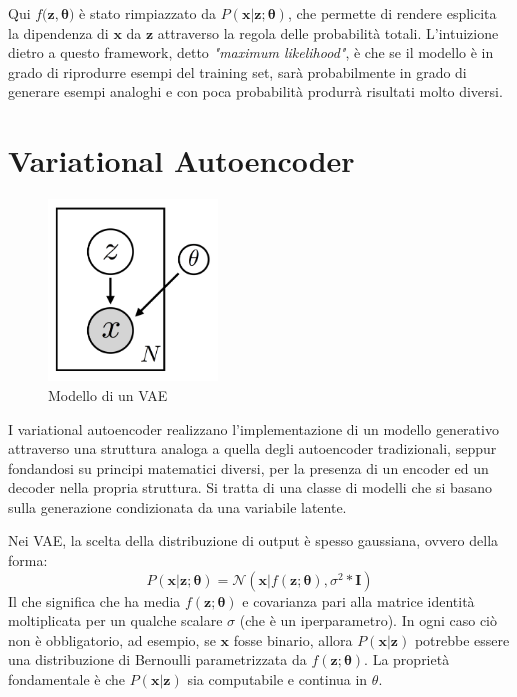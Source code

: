 Qui $f(\boldsymbol{z}, \boldsymbol{\theta)}$ è stato rimpiazzato da $P(\boldsymbol{x} | \boldsymbol{z}; \boldsymbol{\theta})$, che permette di rendere esplicita la dipendenza di $\boldsymbol{x}$ da $\boldsymbol{z}$ attraverso la regola delle probabilità totali. L'intuizione dietro a questo framework, detto \textit{"maximum likelihood"}, è che se il modello è in grado di riprodurre esempi del training set, sarà probabilmente in grado di generare esempi analoghi e con poca probabilità produrrà risultati molto diversi.
\section{Variational Autoencoder}
\begin{figure}[ht]
	\centering
	\includegraphics[width=0.4\textwidth]{img/vae_model.png}
	\caption{Modello di un VAE}
	\label{fig:1.13}
\end{figure}
I variational autoencoder realizzano l'implementazione di un modello generativo attraverso una struttura analoga a quella degli autoencoder tradizionali, seppur fondandosi su principi matematici diversi, per la presenza di un encoder ed un decoder nella propria struttura. Si tratta di una classe di modelli che si basano sulla generazione condizionata da una variabile latente.

Nei VAE, la scelta della distribuzione di output è spesso gaussiana, ovvero della forma:
\begin{equation}
	\label{gaussian_probability}
	P(\boldsymbol{x} | \boldsymbol{z}; \boldsymbol{\theta}) = \mathcal{N}(\boldsymbol{x}|f(\boldsymbol{z}; \boldsymbol{\theta}), \sigma^2 * \boldsymbol{I})
\end{equation}
Il che significa che ha media $f(\boldsymbol{z}; \boldsymbol{\theta})$ e covarianza pari alla matrice identità moltiplicata per un qualche scalare $\sigma$ (che è un iperparametro). In ogni caso ciò non è obbligatorio, ad esempio, se $\boldsymbol{x}$ fosse binario, allora $P(\boldsymbol{x} | \boldsymbol{z})$ potrebbe essere una distribuzione di Bernoulli parametrizzata da $f(\boldsymbol{z}; \boldsymbol{\theta})$. La proprietà fondamentale è che $P(\boldsymbol{x} | \boldsymbol{z})$ sia computabile e continua in $\theta$.

